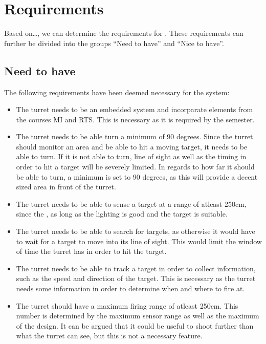\section{Requirements}

Based on\ldots, we can determine the requirements for \namep. These requirements
can further be divided into the groups ``Need to have'' and ``Nice to have''. 

\subsection{Need to have}
The following requirements have been deemed necessary for the system:

\begin{itemize}
  \item The turret needs to be an embedded system and incorparate elements from
  the courses MI and RTS. This is necessary as it is required by the semester.
  \item The turret needs to be able turn a minimum of 90 degrees. Since the
  turret should monitor an area and be able to hit a moving target, it needs to
  be able to turn. If it is not able to turn, line of sight as well as the
  timing in order to hit a target will be severely limited. In regards to how
  far it should be able to turn, a minimum is set to 90 degrees, as this will
  provide a decent sized area in front of the turret.
  \item The turret needs to be able to sense a target at a range of atleast
  250cm, since the , as long as the
  lighting is good and the target is suitable.
  \item The turret needs to be able to search for targets, as otherwise it would
  have to wait for a target to move into its line of sight. This would limit
  the window of time the turret has in order to hit the target.
  \item The turret needs to be able to track a target in order to collect
  information, such as the speed and direction of the target. This is necessary
  as the turret needs some information in order to determine when and where to
  fire at.
  \item The turret should have a maximum firing range of atleast 250cm. This
  number is determined by the maximum sensor range as well as the maximum of
  the design. It can be argued that it could be useful to shoot further than
  what the turret can see, but this is not a necessary feature.

\end{itemize}
